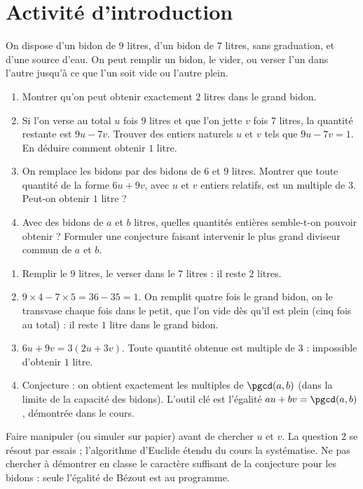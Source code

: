 \mxnewpage
\section{Activité d'introduction}
\begin{activity}
On dispose d'un bidon de $9$ litres, d'un bidon de $7$ litres, sans graduation, et d'une source d'eau. On peut remplir un bidon, le vider, ou verser l'un dans l'autre jusqu'à ce que l'un soit vide ou l'autre plein.
\begin{enumerate}
\item Montrer qu'on peut obtenir exactement $2$ litres dans le grand bidon.
\item Si l'on verse au total $u$ fois $9$ litres et que l'on jette $v$ fois $7$ litres, la quantité restante est $9u-7v$. Trouver des entiers naturels $u$ et $v$ tels que $9u-7v=1$. En déduire comment obtenir $1$ litre.
\item On remplace les bidons par des bidons de $6$ et $9$ litres. Montrer que toute quantité de la forme $6u+9v$, avec $u$ et $v$ entiers relatifs, est un multiple de $3$. Peut-on obtenir $1$ litre ?
\item Avec des bidons de $a$ et $b$ litres, quelles quantités entières semble-t-on pouvoir obtenir ? Formuler une conjecture faisant intervenir le plus grand diviseur commun de $a$ et $b$.
\end{enumerate}
\end{activity}
\begin{solution}[Activité]
\begin{enumerate}
\item Remplir le $9$ litres, le verser dans le $7$ litres : il reste $2$ litres.
\item $9\times4-7\times5=36-35=1$. On remplit quatre fois le grand bidon, on le transvase chaque fois dans le petit, que l'on vide dès qu'il est plein (cinq fois au total) : il reste $1$ litre dans le grand bidon.
\item $6u+9v=3(2u+3v)$. Toute quantité obtenue est multiple de $3$ : impossible d'obtenir $1$ litre.
\item Conjecture : on obtient exactement les multiples de $\pgcd(a,b)$ (dans la limite de la capacité des bidons). L'outil clé est l'égalité $au+bv=\pgcd(a,b)$, démontrée dans le cours.
\end{enumerate}
\end{solution}
\begin{teachernote}
Faire manipuler (ou simuler sur papier) avant de chercher $u$ et $v$. La question 2 se résout par essais ; l'algorithme d'Euclide étendu du cours la systématise. Ne pas chercher à démontrer en classe le caractère suffisant de la conjecture pour les bidons : seule l'égalité de Bézout est au programme.
\end{teachernote}

